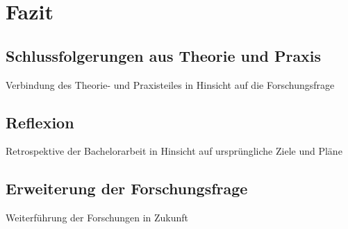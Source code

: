 \clearpage
\section{Fazit}
\label{sec:conclusion}

\subsection{Schlussfolgerungen aus Theorie und Praxis}
Verbindung des Theorie- und Praxisteiles in Hinsicht auf die Forschungsfrage

\subsection{Reflexion}
Retrospektive der Bachelorarbeit in Hinsicht auf ursprüngliche Ziele und Pläne

\subsection{Erweiterung der Forschungsfrage}
Weiterführung der Forschungen in Zukunft
